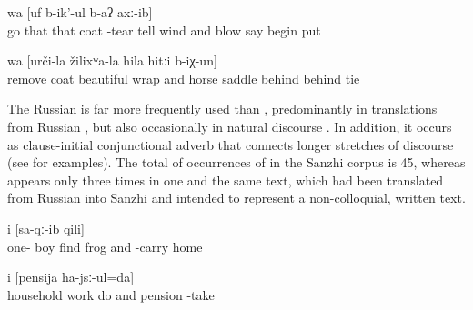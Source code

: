 \begin{exe}
	\ex	\label{ex:‎I will blow at him, I will take his coat off, said the wind and began to blow}
	\gll	[``du	či-b-uq-un-ne	hel-i-j,	hel-i-la	walžaʁ	či-r-sa-jsː-an=da,''	b-urs-ib	č'an-ni]	wa	[uf	b-ik'-ul	b-aʔ	axː-ib]\\
			go	that	that	coat	-tear	tell	wind	and	blow	\tsc{n-}say	begin	put\\
	\glt	{}

	\ex	\label{ex:‎‎‎He took off his coat, put it together well, and tied it to his horse's saddle.}
		wa	[urči-la	žilixʷa-la	hila	hitːi	b-iχ-un]\\
		remove		coat	beautiful	wrap	and	horse\tsc{-gen}	saddle	behind	behind	tie\\
	\glt	{}
\end{exe}

The Russian   is far more frequently used than , predominantly in translations from Russian , but also occasionally in natural discourse . In addition, it occurs as clause-initial conjunctional adverb   that connects longer stretches of discourse (see  for examples). The total  of occurrences of  in the Sanzhi corpus is 45, whereas   appears only three times in one and the same text, which had been translated from Russian into Sanzhi and intended to represent a non-colloquial, written text.

\begin{exe}
	\ex	\label{ex:‎‎‎Once a boy found a frog and brought it home}
		i	[sa-qː-ib	qili]\\
		one-	boy	find frog	and	-carry	home\\
	\glt	{}

	\ex	\label{ex:‎I am doing my house work and get a pension.}
	\gll	[di-la	xazajstweni	ʡaˁči	d-irq'-ul=da]	i	[pensija	ha-jsː-ul=da]\\
			household	work	do	and	pension	-take\\
	\glt	{}
\end{exe}


